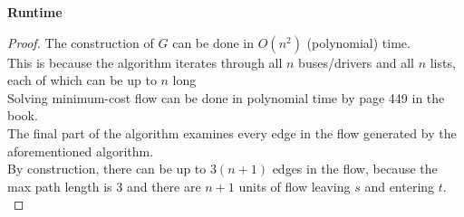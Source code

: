 \begin{problem}
    \noindent
    \textbf{Runtime}
    \begin{proof}
        The construction of $G$ can be done in $O(n^2)$ (polynomial) time. \\
        This is because the algorithm iterates through all $n$ buses/drivers and all $n$ lists, each of which can be up to $n$ long \\
        Solving minimum-cost flow can be done in polynomial time by page 449 in the book. \\
        The final part of the algorithm examines every edge in the flow generated by the aforementioned algorithm. \\
        By construction, there can be up to $3(n+1)$ edges in the flow, because the max path length is $3$ and there are $n+1$ units of flow leaving
        $s$ and entering $t$. \\
    \end{proof}
\end{problem}
